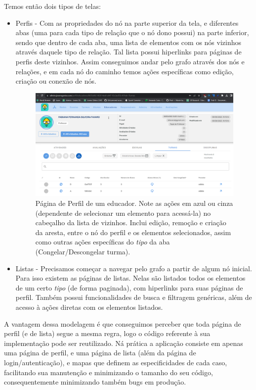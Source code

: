 Temos então dois tipos de telas:
\begin{itemize}
    \item Perfis - Com as propriedades do nó na parte superior da tela, e diferentes abas (uma para cada tipo de relação que o nó dono possui) na parte inferior, sendo que dentro de cada aba, uma lista de elementos com os nós vizinhos através daquele tipo de relação. Tal lista possui hiperlinks para páginas de perfis deste vizinhos. Assim conseguimos andar pelo grafo através dos nós e relações, e em cada nó do caminho temos ações específicas como edição, criação ou conexão de nós.
        
    \begin{figure}[H]
        \centering
        \includegraphics[width=1.0\linewidth]{Imagens/chap04/perfil-exemplo.png}
        \caption{Página de Perfil de um educador. Note as ações em azul ou cinza (dependente de selecionar um elemento para acessá-la) no cabeçalho da lista de vizinhos. Inclui edição, remoção e criação da aresta, entre o nó do perfil e os elementos selecionados, assim como outras ações específicas do \textit{tipo} da aba (Congelar/Descongelar turma).}
        \label{fig:profile-exemple}
    \end{figure}
    
    \item Listas - Precisamos começar a navegar pelo grafo a partir de algum nó inicial. Para isso existem as páginas de listas. Nelas são listados todos os elementos de um certo \textit{tipo} (de forma paginada), com hiperlinks para suas páginas de perfil. Também possui funcionalidades de busca e filtragem genéricas, além de acesso à ações diretas com os elementos listados.
\end{itemize}

A vantagem dessa modelagem é que conseguimos perceber que toda página de perfil (e de lista) segue a mesma regra, logo o código referente à sua implementação pode ser reutilizado. Ná prática a aplicação consiste em apenas uma página de perfil, e uma página de lista (além da página de login/autenticação), e mapas que definem as especificidades de cada caso, facilitando sua manutenção e minimizando o tamanho do seu código, consequentemente minimizando também bugs em produção.

